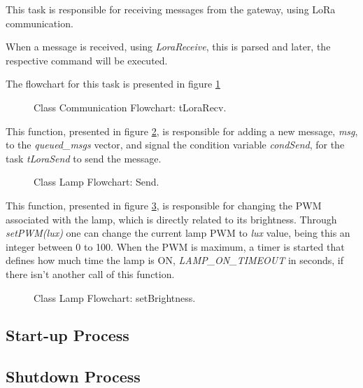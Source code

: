 
This task is responsible for receiving messages from the gateway, using LoRa communication.

When a message is received, using \textit{LoraReceive}, this is parsed and later, the respective command will be executed.

The flowchart for this task is presented in figure \ref{fig:flow_tlorarecv}

\begin{figure}[H]
	\caption{Class Communication Flowchart: tLoraRecv.}
	\label{fig:flow_tlorarecv}
\end{figure}


This function, presented in figure \ref{fig:flow_send}, is responsible for adding a new message, \textit{msg}, to the \textit{queued\_msgs} vector, and signal the condition variable \textit{condSend}, for the task \textit{tLoraSend} to send the message.

\begin{figure}[H]
	\centering	
	\caption{Class Lamp Flowchart: Send.}
	\label{fig:flow_send}
\end{figure}


This function, presented in figure \ref{fig:flow_setbrightness}, is responsible for changing the PWM associated with the lamp, which is directly related to its brightness. Through \textit{setPWM(lux)} one can change the current lamp PWM to \textit{lux} value, being this an integer between 0 to 100. When the PWM is maximum, a timer is started that defines how much time the lamp is ON, \textit{LAMP\_ON\_TIMEOUT} in seconds, if there isn't another call of this function.

\begin{figure}[H]
	\centering	
	\caption{Class Lamp Flowchart: setBrightness.}
	\label{fig:flow_setbrightness}
\end{figure}
\subsection{Start-up Process}

\subsection{Shutdown Process}

